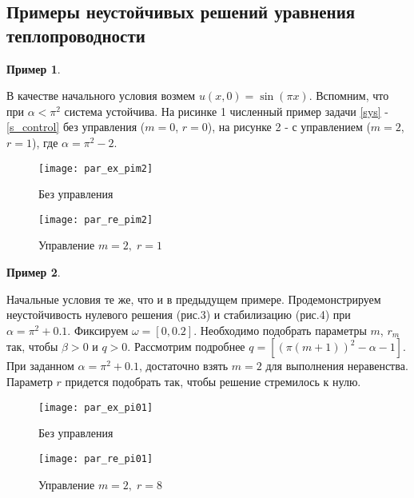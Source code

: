 \subsection{Примеры неустойчивых решений уравнения теплопроводности}
\vspace{1em}

\newtheorem{exmp}{Пример}

\begin{exmp}
\end{exmp}

В качестве начального условия возмем $u(x, 0) = \sin{(\pi x)}$. Вспомним, что при $\alpha < \pi^2$ система устойчива. На рисинке 1 численный пример задачи \eqref{sys} - \eqref{s_control} без управления ($m = 0$, $r = 0$), на рисунке 2 - с управлением ($m = 2$, $r = 1$), где $\alpha = \pi^2 - 2$.


\begin{figure}[H]
\centering
\begin{minipage}{.5\textwidth}
  \centering
  \texttt{[image: par\_ex\_pim2]}
  \caption{Без управления}
  \label{fig:test1}
\end{minipage}%
\begin{minipage}{.5\textwidth}
  \centering
  \texttt{[image: par\_re\_pim2]}
  \caption{Управление $m = 2,\; r = 1$}
  \label{fig:test2}
\end{minipage}
\end{figure}

\begin{exmp}
\end{exmp}

Начальные условия те же, что и в предыдущем примере. Продемонстрируем неустойчивость нулевого решения (рис.3) и стабилизацию (рис.4) при $\alpha = \pi^2 + 0.1$. Фиксируем $\omega = [0, 0.2]$. Необходимо подобрать параметры $m$, $r_m$ так, чтобы $\beta > 0$ и $q > 0$. Рассмотрим подробнее $q = [(\pi(m + 1))^2 - \alpha - 1]$. При заданном $\alpha = \pi^2 + 0.1$, достаточно взять $m = 2$ для выполнения неравенства. Параметр $r$ придется подобрать так, чтобы решение стремилось к нулю.


\begin{figure}[H]
\centering
\begin{minipage}{.5\textwidth}
  \centering
  \texttt{[image: par\_ex\_pi01]}
  \caption{Без управления}
  \label{fig:test1}
\end{minipage}%
\begin{minipage}{.5\textwidth}
  \centering
  \texttt{[image: par\_re\_pi01]}
  \caption{Управление $m = 2,\; r = 8$}
  \label{fig:test2}
\end{minipage}
\end{figure}


